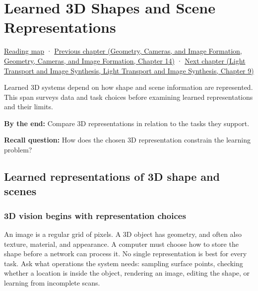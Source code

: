 \hypertarget{04-visual-computing-ii-ch034}{}
\chapter{Learned 3D Shapes and Scene Representations}\label{stagechapter:04-visual-computing-ii-ch034}\label{04-visual-computing-ii-ch034-learned-3d-shapes-and-scene-representations}

\hyperref[volume-reading-map]{Reading map} · \href{../03-Geometry-Cameras-and-Image-Formation/main.pdf\#nameddest=04-visual-computing-ii-ch033-projection-scale-and-incidence-geometry}{Previous chapter (Geometry, Cameras, and Image Formation, Geometry, Cameras, and Image Formation, Chapter 14)} · \href{../04-Light-Transport-and-Image-Synthesis/main.pdf\#nameddest=04-visual-computing-ii-ch035-a-complete-renderer-as-an-executable-forward-model}{Next chapter (Light Transport and Image Synthesis, Light Transport and Image Synthesis, Chapter 9)}

Learned 3D systems depend on how shape and scene information are represented. This span surveys data and task choices before examining learned representations and their limits.

\textbf{By the end:} Compare 3D representations in relation to the tasks they support.

\textbf{Recall question:} How does the chosen 3D representation constrain the learning problem?

\section{Learned representations of 3D shape and scenes}\label{04-visual-computing-ii-ch034-learned-representations-of-3d-shape-and-scenes}

\subsection{3D vision begins with representation choices}\label{04-visual-computing-ii-ch034-d-vision-begins-with-representation-choices}

An image is a regular grid of pixels. A 3D object has geometry, and often also texture, material, and appearance. A computer must choose how to store the shape before a network can process it. No single representation is best for every task. Ask what operations the system needs: sampling surface points, checking whether a location is inside the object, rendering an image, editing the shape, or learning from incomplete scans.


